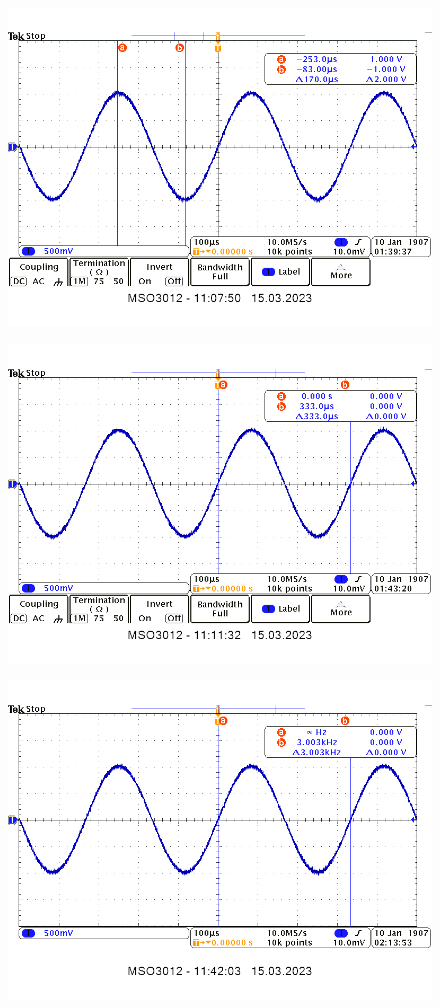 \documentclass[14pt, table]{extarticle}
\begin{document}
\begin{figure}[H]
\includegraphics[scale=0.7]{A12}
\centering
\end{figure}

\begin{figure}[H]
\includegraphics[scale=0.7]{A13}
\centering
\end{figure}

\begin{figure}[H]
\includegraphics[scale=0.7]{A14}
\centering
\end{figure}
\end{document}
